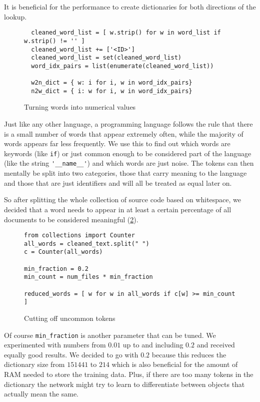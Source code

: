     It is beneficial for the performance to create dictionaries for both directions of the lookup.

    \begin{figure}[htpb]
      \centering
      \begin{lstlisting}
  cleaned_word_list = [ w.strip() for w in word_list if w.strip() != '' ]
  cleaned_word_list += ['<ID>']
  cleaned_word_list = set(cleaned_word_list)
  word_idx_pairs = list(enumerate(cleaned_word_list))

  w2n_dict = { w: i for i, w in word_idx_pairs}
  n2w_dict = { i: w for i, w in word_idx_pairs} \end{lstlisting}
      \caption{Turning words into numerical values}
      \label{fig:tonums}
    \end{figure}

    Just like any other language, a programming language follows the rule that there is a small number of words that
    appear extremely often, while the majority of words appears far less frequently. We use this to
    find out which words are keywords (like \verb+if+) or just common enough to be considered part of the language
    (like the string \verb+'__name__'+) and which words are just noise. The tokens can then mentally be split into
    two categories, those that carry meaning to the language and those that are just identifiers and will all be treated
    as equal later on.
  
    So after splitting the whole collection of source code based on whitespace, we decided that a word needs to appear
    in at least a certain percentage of all documents to be considered meaningful (\ref{fig:downsamp}).

    \begin{figure}[htpb]
      \centering
  \begin{lstlisting}
from collections import Counter
all_words = cleaned_text.split(" ")
c = Counter(all_words)

min_fraction = 0.2
min_count = num_files * min_fraction

reduced_words = [ w for w in all_words if c[w] >= min_count ] \end{lstlisting}
      \caption{Cutting off uncommon tokens}
      \label{fig:downsamp}
    \end{figure}

    Of course \verb+min_fraction+ is another parameter that can be tuned. We experimented with numbers 
    from $0.01$ up to and including $0.2$ and received equally good results. We decided to go with $0.2$ because this
    reduces the dictionary size from $151441$ to $214$ which is also beneficial for the amount of RAM needed
    to store the training data. Plus, if there are too many tokens in the dictionary the network might
    try to learn to differentiate between objects that actually mean the same.


